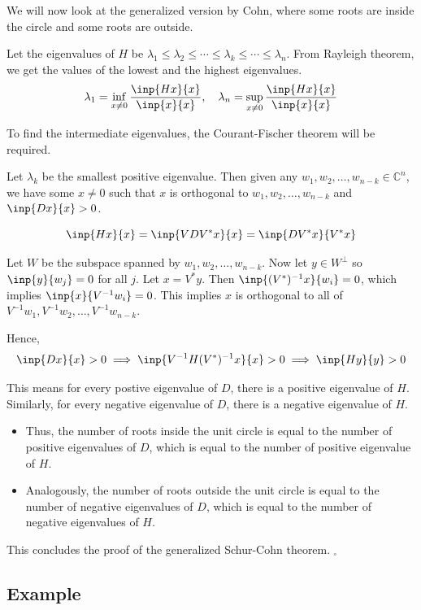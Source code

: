 \documentclass[twoside]{article}
\newcommand*\adj[1]{#1^*}
\theoremstyle{plain}
\theoremstyle{definition}
\theoremstyle{remark}
\begin{document}
We will now look at the generalized version by Cohn, where some roots are inside the circle and some roots are outside.




Let the eigenvalues of \(H\) be \(\lambda_1 \le \lambda_2 \le \cdots \le \lambda_k \le \cdots \le \lambda_n\).
From Rayleigh theorem, we get the values of the lowest and the highest eigenvalues. 
\[\lambda_1 = \inf _{x \ne 0} \frac{\inp{Hx}{x}}{\inp{x}{x}}, \quad \lambda_n = \sup_{x \ne 0} \frac{\inp{Hx}{x}}{\inp{x}{x}}\]

To find the intermediate eigenvalues, the Courant-Fischer theorem will be required. 


Let \(\lambda_k\) be the smallest positive eigenvalue. Then given any \(w_1, w_2, \ldots , w_{n-k} \in \mathbb{C}^n\), we have some \(x \ne 0\) such that \(x\) is orthogonal to \( w_1, w_2 , \ldots , w_{n-k}\) and \(\inp{Dx}{x} > 0\).

\[\inp{Hx}{x} = \inp{VD\adj{V} x}{x} = \inp{D\adj{V} x}{\adj{V}x}\]

 Let \(W\) be the subspace spanned by \(w_1, w_2, \ldots , w_{n-k}\). Now let \(y \in W^\perp\) so \(\inp{y}{w_j} = 0\) for all \(j\). Let \(x = \adj{V}y\).  Then \( \inp{(\adj{V})^{-1}x}{w_i} = 0\), which implies  \( \inp{x}{V^{-1} w_i} = 0\). This implies \(x\) is orthogonal to all of \(V^{-1}w_1,  V^{-1} w_2, \ldots , V^{-1} w_{n-k}\).

Hence,
\[\inp{Dx}{x} > 0 \implies \inp{V^{-1} H (\adj{V})^{-1} x}{x} > 0 \implies \inp{Hy}{y} > 0\]

This means for every postive eigenvalue of \(D\), there is a positive eigenvalue of \(H\). Similarly, for every negative eigenvalue of \(D\), there is a negative eigenvalue of \(H\). 

\begin{itemize}
\item Thus, the number of roots inside the unit circle is equal to the number of positive eigenvalues of \(D\), which is equal to the number of positive eigenvalue of \(H\).
 
\item Analogously, the number of roots outside the unit circle is equal to the number of negative eigenvalues of \(D\), which is equal to the number of negative eigenvalues of \(H\).
\end{itemize}
This concludes the proof of the generalized Schur-Cohn theorem. \(_\square\)
\subsection{Example}
\end{document}
